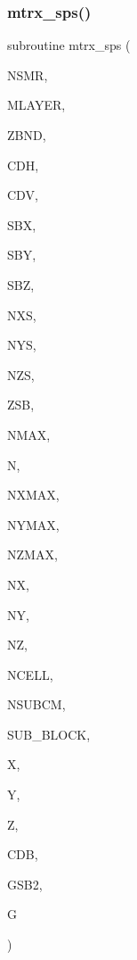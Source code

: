\subsubsection{\texorpdfstring{mtrx\+\_\+sps()}{mtrx\_sps()}}
{\footnotesize\ttfamily subroutine mtrx\+\_\+sps (\begin{DoxyParamCaption}\item[{integer}]{N\+S\+MR,  }\item[{integer}]{M\+L\+A\+Y\+ER,  }\item[{real, dimension(0\+:mlayer)}]{Z\+B\+ND,  }\item[{complex, dimension(0\+:mlayer)}]{C\+DH,  }\item[{complex, dimension(0\+:mlayer)}]{C\+DV,  }\item[{real}]{S\+BX,  }\item[{real}]{S\+BY,  }\item[{real}]{S\+BZ,  }\item[{integer}]{N\+XS,  }\item[{integer}]{N\+YS,  }\item[{integer}]{N\+ZS,  }\item[{real}]{Z\+SB,  }\item[{integer}]{N\+M\+AX,  }\item[{integer}]{N,  }\item[{integer}]{N\+X\+M\+AX,  }\item[{integer}]{N\+Y\+M\+AX,  }\item[{integer}]{N\+Z\+M\+AX,  }\item[{integer, dimension(sub\+\_\+block)}]{NX,  }\item[{integer, dimension(sub\+\_\+block)}]{NY,  }\item[{integer, dimension(sub\+\_\+block)}]{NZ,  }\item[{integer, dimension(sub\+\_\+block)}]{N\+C\+E\+LL,  }\item[{integer}]{N\+S\+U\+B\+CM,  }\item[{integer}]{S\+U\+B\+\_\+\+B\+L\+O\+CK,  }\item[{real, dimension(nxmax,sub\+\_\+block)}]{X,  }\item[{real, dimension(nymax,sub\+\_\+block)}]{Y,  }\item[{real, dimension(nzmax,sub\+\_\+block)}]{Z,  }\item[{complex, dimension(nsubcm,sub\+\_\+block)}]{C\+DB,  }\item[{complex, dimension(nsmr/3,3)}]{G\+S\+B2,  }\item[{complex, dimension(nmax,n)}]{G }\end{DoxyParamCaption})}

